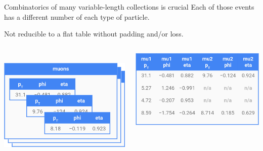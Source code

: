 \documentclass[aspectratio=169]{beamer}
\begin{document}
\begin{frame}{Combinatorics of many variable-length collections is crucial}
\Large
\vspace{0.25 cm}
Each of those events has a different number of each type of particle.

\vspace{0.25 cm}
Not reducible to a flat table without padding and/or loss.

\vspace{0.5 cm}
\begin{columns}[b]
\mbox{ } \hfill \includegraphics[width=0.9\linewidth]{muons-as-objects-2.png} \hfill \mbox{ }

\includegraphics[width=\linewidth]{muons-as-a-table.png}
\end{columns}
\end{frame}


\end{document}
